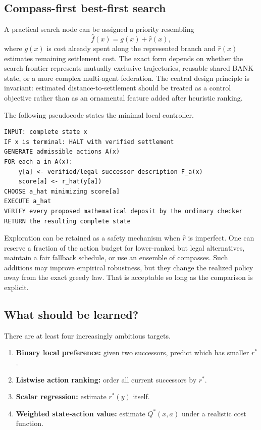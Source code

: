 \documentclass[11pt,letterpaper]{article}
\theoremstyle{remark}
\newcommand{\rstar}{r^{\!*}}
\newcommand{\rhat}{\widehat r}
\newcommand{\Qstar}{Q^{\!*}}
\begin{document}
\subsection{Compass-first best-first search}

A practical search node can be assigned a priority resembling
\[
\widehat f(x)=g(x)+\rhat(x),
\]
where $g(x)$ is cost already spent along the represented branch and $\rhat(x)$ estimates remaining settlement cost. The exact form depends on whether the search frontier represents mutually exclusive trajectories, reusable shared BANK state, or a more complex multi-agent federation. The central design principle is invariant: estimated distance-to-settlement should be treated as a control objective rather than as an ornamental feature added after heuristic ranking.

The following pseudocode states the minimal local controller.

\begin{tcolorbox}[colback=softgray,colframe=linegray,title={Compass controller: unit-cost local decision}]
\begin{verbatim}
INPUT: complete state x
IF x is terminal: HALT with verified settlement
GENERATE admissible actions A(x)
FOR each a in A(x):
    y[a] <- verified/legal successor description F_a(x)
    score[a] <- r_hat(y[a])
CHOOSE a_hat minimizing score[a]
EXECUTE a_hat
VERIFY every proposed mathematical deposit by the ordinary checker
RETURN the resulting complete state
\end{verbatim}
\end{tcolorbox}

Exploration can be retained as a safety mechanism when $\rhat$ is imperfect. One can reserve a fraction of the action budget for lower-ranked but legal alternatives, maintain a fair fallback schedule, or use an ensemble of compasses. Such additions may improve empirical robustness, but they change the realized policy away from the exact greedy law. That is acceptable so long as the comparison is explicit.

\subsection{What should be learned?}

There are at least four increasingly ambitious targets.

\begin{enumerate}
\item \textbf{Binary local preference:} given two successors, predict which has smaller $\rstar$.
\item \textbf{Listwise action ranking:} order all current successors by $\rstar$.
\item \textbf{Scalar regression:} estimate $\rstar(y)$ itself.
\item \textbf{Weighted state-action value:} estimate $\Qstar(x,a)$ under a realistic cost function.
\end{enumerate}
\end{document}
